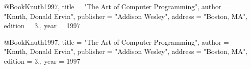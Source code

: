 @Book{Knuth1997,
  title = "The Art of Computer Programming",
  author = "Knuth, Donald Ervin",
  publisher = "Addison Wesley",
  address = "Boston, MA",
  edition = {3.},
  year = 1997
}

@Book{Knuth1997,
  title = "The Art of Computer Programming",
  author = "Knuth, Donald Ervin",
  publisher = "Addison Wesley",
  address = "Boston, MA",
  edition = {3.},
  year = 1997
}
